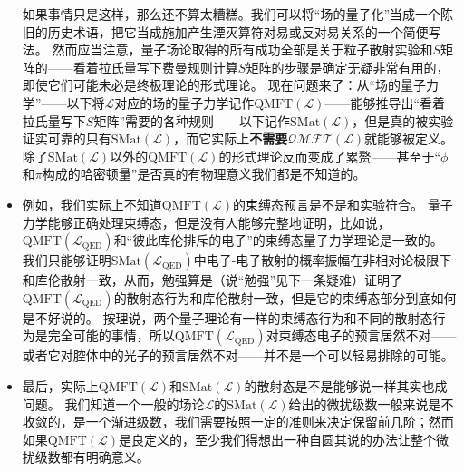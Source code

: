\documentclass[hyperref, UTF8, a4paper]{ctexbook}
\renewcommand{\emph}{\textbf}
\begin{document}
\begin{itemize}
    如果事情只是这样，那么还不算太糟糕。我们可以将“场的量子化”当成一个陈旧的历史术语，把它当成施加产生湮灭算符对易或反对易关系的一个简便写法。
    然而应当注意，量子场论取得的所有成功全部是关于粒子散射实验和$S$矩阵的——看着拉氏量写下费曼规则计算$S$矩阵的步骤是确定无疑非常有用的，即使它们可能未必是终极理论的形式理论。
    现在问题来了：从“场的量子力学”——以下将$\mathcal{L}$对应的场的量子力学记作$\mathrm{QMFT}(\mathcal{L})$——能够推导出“看着拉氏量写下$S$矩阵”需要的各种规则——以下记作$\mathrm{SMat}(\mathcal{L})$，但是真的被实验证实可靠的只有$\mathrm{SMat}(\mathcal{L})$，而它实际上\emph{不需要}$\mathcal{QMFT}(\mathcal{L})$就能够被定义。
    除了$\mathrm{SMat}(\mathcal{L})$以外的$\mathrm{QMFT}(\mathcal{L})$的形式理论反而变成了累赘——甚至于“$\phi$和$\pi$构成的哈密顿量”是否真的有物理意义我们都是不知道的。
    \item 例如，我们实际上不知道$\mathrm{QMFT}(\mathcal{L})$的束缚态预言是不是和实验符合。
    量子力学能够正确处理束缚态，但是没有人能够完整地证明，比如说，$\mathrm{QMFT}(\mathcal{L}_\text{QED})$和“彼此库伦排斥的电子”的束缚态量子力学理论是一致的。
    我们只能够证明$\mathrm{SMat}(\mathcal{L}_\text{QED})$中电子-电子散射的概率振幅在非相对论极限下和库伦散射一致，从而，勉强算是（说“勉强”见下一条疑难）证明了$\mathrm{QMFT}(\mathcal{L}_\text{QED})$的散射态行为和库伦散射一致，但是它的束缚态部分到底如何是不好说的。
    按理说，两个量子理论有一样的束缚态行为和不同的散射态行为是完全可能的事情，所以$\mathrm{QMFT}(\mathcal{L}_\text{QED})$对束缚态电子的预言居然不对——或者它对腔体中的光子的预言居然不对——并不是一个可以轻易排除的可能。
    \item 最后，实际上$\mathrm{QMFT}(\mathcal{L})$和$\mathrm{SMat}(\mathcal{L})$的散射态是不是能够说一样其实也成问题。
    我们知道一个一般的场论$\mathcal{L}$的$\mathrm{SMat}(\mathcal{L})$给出的微扰级数一般来说是不收敛的，是一个渐进级数，我们需要按照一定的准则来决定保留前几阶；然而如果$\mathrm{QMFT}(\mathcal{L})$是良定义的，至少我们得想出一种自圆其说的办法让整个微扰级数都有明确意义。
\end{itemize}
\end{document}
